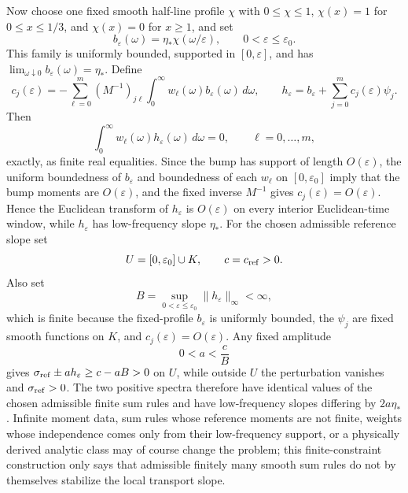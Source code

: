 Now choose one fixed smooth half-line profile \(\chi\) with
\(0\le\chi\le1\), \(\chi(x)=1\) for \(0\le x\le1/3\), and
\(\chi(x)=0\) for \(x\ge1\), and set
\[
  b_\varepsilon(\omega)=\eta_\ast\chi(\omega/\varepsilon),
  \qquad 0<\varepsilon\le\varepsilon_0 .
\]
This family is uniformly bounded, supported in \([0,\varepsilon]\), and has
\(\lim_{\omega\downarrow0}b_\varepsilon(\omega)=\eta_\ast\).  Define
\begin{equation}
  c_j(\varepsilon)
  =
  -\sum_{\ell=0}^m(M^{-1})_{j\ell}
  \int_0^\infty w_\ell(\omega)b_\varepsilon(\omega)\,d\omega,
  \qquad
  h_\varepsilon
  =
  b_\varepsilon+\sum_{j=0}^m c_j(\varepsilon)\psi_j .
  \label{eq:thermal-finite-sum-rule-preserving-bump}
\end{equation}
Then
\[
  \int_0^\infty w_\ell(\omega)h_\varepsilon(\omega)\,d\omega=0,
  \qquad \ell=0,\ldots,m,
\]
exactly, as finite real equalities.  Since the bump has support of length
\(O(\varepsilon)\), the uniform boundedness of \(b_\varepsilon\) and boundedness
of each \(w_\ell\) on \([0,\varepsilon_0]\) imply that the bump moments are
\(O(\varepsilon)\), and the fixed inverse \(M^{-1}\) gives
\(c_j(\varepsilon)=O(\varepsilon)\).  Hence the Euclidean transform of
\(h_\varepsilon\) is \(O(\varepsilon)\) on every interior Euclidean-time
window, while \(h_\varepsilon\) has low-frequency slope \(\eta_\ast\).  For the
chosen admissible reference slope set
\[
  U=[0,\varepsilon_0]\cup K,
  \qquad
  c=c_{\rm ref}>0 .
\]
Also set
\[
  B=
  \sup_{0<\varepsilon\le\varepsilon_0}
  \|h_\varepsilon\|_\infty
  <\infty ,
\]
which is finite because the fixed-profile \(b_\varepsilon\) is uniformly
bounded, the \(\psi_j\) are fixed smooth functions on \(K\), and
\(c_j(\varepsilon)=O(\varepsilon)\).  Any fixed amplitude
\begin{equation}
  0<a<\frac{c}{B}
  \label{eq:thermal-finite-sum-rule-positivity-amplitude}
\end{equation}
gives
\(\sigma_{\rm ref}\pm a h_\varepsilon\ge c-aB>0\) on \(U\), while outside
\(U\) the perturbation vanishes and \(\sigma_{\rm ref}>0\).  The two
positive spectra therefore have identical values of the chosen admissible
finite sum rules and have low-frequency slopes differing by \(2a\eta_\ast\).
Infinite moment data, sum rules whose reference moments are not finite, weights
whose independence comes only from their low-frequency support, or a physically
derived analytic class may of course change the problem; this finite-constraint
construction only says that admissible finitely many smooth sum rules do not by
themselves stabilize the local transport slope.

